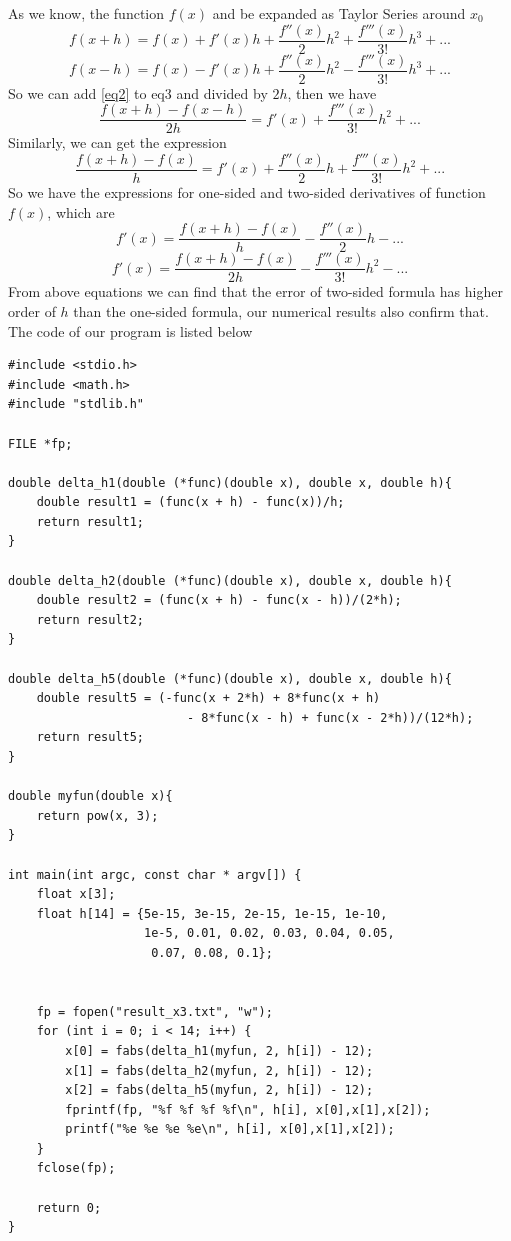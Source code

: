 \documentclass{article}
\begin{document}
As we know, the function $f(x)$ and be expanded as Taylor Series around $x_0$
\begin{equation} \label{eq2}
f(x + h) = f(x) + f'(x)h + \frac{f''(x)}{2}h^2 + \frac{f'''(x)}{3!}h^3 + ...
\end{equation}
\begin{equation} \label{eq3}
f(x - h) = f(x) - f'(x)h + \frac{f''(x)}{2}h^2 - \frac{f'''(x)}{3!}h^3 + ...
\end{equation}
So we can add \ref{eq2} to {eq3} and divided by $2h$, then we have
\begin{equation}
\frac{f(x + h) - f(x - h)}{2h} = f'(x) + \frac{f'''(x)}{3!}h^2 + ...
\end{equation}
Similarly, we can get the expression 
\begin{equation}
\frac{f(x + h) - f(x)}{h} = f'(x) + \frac{f''(x)}{2}h + \frac{f'''(x)}{3!}h^2 + ...
\end{equation}
So we have the expressions for one-sided and two-sided derivatives of function $f(x)$, which are
\begin{equation}
f'(x) = \frac{f(x + h) - f(x)}{h} - \frac{f''(x)}{2}h - ...
\end{equation}
\begin{equation}\label{7}
f'(x) = \frac{f(x + h) - f(x)}{2h} - \frac{f'''(x)}{3!}h^2 - ...
\end{equation}
From above equations we can find that the error of two-sided formula has higher order of $h$ than the one-sided formula, our numerical results also confirm that. The code of our program is listed below


\begin{lstlisting}
#include <stdio.h>
#include <math.h>
#include "stdlib.h"

FILE *fp;

double delta_h1(double (*func)(double x), double x, double h){
    double result1 = (func(x + h) - func(x))/h;
    return result1;
}

double delta_h2(double (*func)(double x), double x, double h){
    double result2 = (func(x + h) - func(x - h))/(2*h);
    return result2;
}

double delta_h5(double (*func)(double x), double x, double h){
    double result5 = (-func(x + 2*h) + 8*func(x + h) 
                         - 8*func(x - h) + func(x - 2*h))/(12*h);
    return result5;
}

double myfun(double x){
    return pow(x, 3);
}

int main(int argc, const char * argv[]) {
    float x[3];
    float h[14] = {5e-15, 3e-15, 2e-15, 1e-15, 1e-10, 
                   1e-5, 0.01, 0.02, 0.03, 0.04, 0.05, 
                    0.07, 0.08, 0.1};

    
    fp = fopen("result_x3.txt", "w");
    for (int i = 0; i < 14; i++) {
        x[0] = fabs(delta_h1(myfun, 2, h[i]) - 12);
        x[1] = fabs(delta_h2(myfun, 2, h[i]) - 12);
        x[2] = fabs(delta_h5(myfun, 2, h[i]) - 12);
        fprintf(fp, "%f %f %f %f\n", h[i], x[0],x[1],x[2]);
        printf("%e %e %e %e\n", h[i], x[0],x[1],x[2]);
    }
    fclose(fp);
    
    return 0;
}
\end{lstlisting} 
\end{document}
